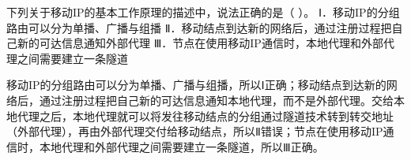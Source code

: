 \question 下列关于移动IP的基本工作原理的描述中，说法正确的是（ ）。
Ⅰ．移动IP的分组路由可以分为单播、广播与组播
Ⅱ．移动结点到达新的网络后，通过注册过程把自己新的可达信息通知外部代理
Ⅲ．节点在使用移动IP通信时，本地代理和外部代理之间需要建立一条隧道
\par{}
\begin{solution}移动IP的分组路由可以分为单播、广播与组播，所以Ⅰ正确；移动结点到达新的网络后，通过注册过程把自己新的可达信息通知本地代理，而不是外部代理。交给本地代理之后，本地代理就可以将发往移动结点的分组通过隧道技术转到转交地址（外部代理），再由外部代理交付给移动结点，所以Ⅱ错误；节点在使用移动IP通信时，本地代理和外部代理之间需要建立一条隧道，所以Ⅲ正确。
\end{solution}
